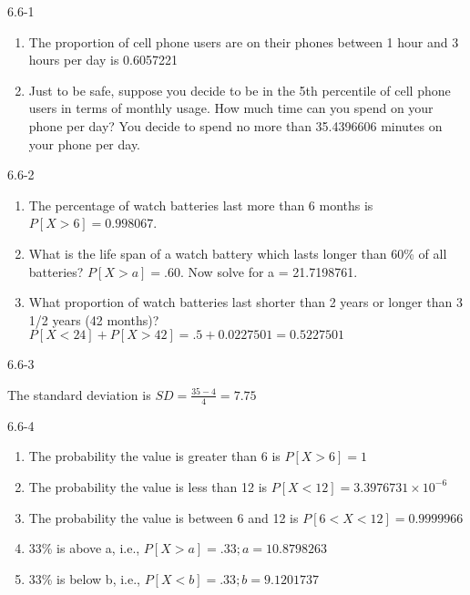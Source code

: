 \begin{exsol@solution}{6.6-1}

\begin{enumerate}
	\item The proportion of cell phone users are on their phones between 1 hour
and 3 hours per day is 0.6057221
  \item Just to be safe, suppose you decide to be in the 5th percentile of
cell phone users in terms of monthly usage.  How much time can you spend on your phone per day? You decide to spend no more than 35.4396606 minutes on your phone per day.
	\end{enumerate}
\end{exsol@solution}
\begin{exsol@solution}{6.6-2}


\begin{enumerate}
	\item The percentage of watch batteries last more than 6 months is $P[ X > 6] = 0.998067$.
	\item What is the life span of a watch battery which lasts longer than 60\% of all batteries?  $P[X > a] = .60$. Now solve for a = 21.7198761.
	\item What proportion of watch batteries last shorter than 2 years or longer
than 3 1/2 years (42 months)?
$P[X < 24] + P[X > 42] = .5 + 0.0227501 = 0.5227501$
 \end{enumerate}

\end{exsol@solution}
\begin{exsol@solution}{6.6-3}


    The standard deviation is $SD = \frac{35 - 4}{4} = 7.75$
\end{exsol@solution}
\begin{exsol@solution}{6.6-4}

\begin{enumerate}
\item The probability the value is greater than 6 is $P[X > 6] = 1$
\item The probability the value is less than 12 is $P[X < 12] = \ensuremath{3.3976731\times 10^{-6}}$
\item The probability the value is between 6 and 12 is $P[ 6 < X < 12] = 0.9999966$
\item 33\% is above a, i.e., $P[X > a] = .33; a = 10.8798263$
\item 33\% is below b, i.e., $P[X < b] = .33; b = 9.1201737$
\end{enumerate}
\end{exsol@solution}
